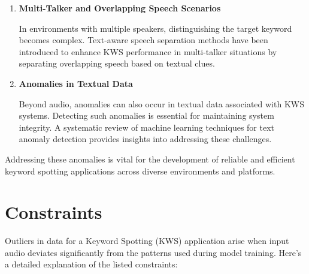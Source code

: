 \begin{enumerate}
	\item \textbf{Multi-Talker and Overlapping Speech Scenarios}
	
	In environments with multiple speakers, distinguishing the target keyword becomes complex. Text-aware speech separation methods have been introduced to enhance KWS performance in multi-talker situations by separating overlapping speech based on textual clues.\cite{Li:2024}
	
	\item \textbf{Anomalies in Textual Data}
	
	Beyond audio, anomalies can also occur in textual data associated with KWS systems. Detecting such anomalies is essential for maintaining system integrity. A systematic review of machine learning techniques for text anomaly detection provides insights into addressing these challenges.\cite{Boutalbi:2023}
\end{enumerate}

Addressing these anomalies is vital for the development of reliable and efficient keyword spotting applications across diverse environments and platforms. 



\section{Constraints}

Outliers in data for a Keyword Spotting (KWS) application arise when input audio deviates significantly from the patterns used during model training. Here’s a detailed explanation of the listed constraints:

